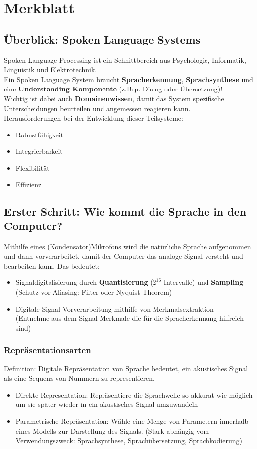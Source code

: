 \newpage
\section{Merkblatt}
\subsection{Überblick: Spoken Language Systems}
Spoken Language Processing ist ein Schnittbereich aus Psychologie, Informatik, Linguistik und Elektrotechnik. \\
Ein Spoken Language System braucht \textbf{Spracherkennung}, \textbf{Sprachsynthese} und eine \textbf{Understanding-Komponente} (z.Bsp. Dialog oder Übersetzung)! \\
Wichtig ist dabei auch \textbf{Domainenwissen}, damit das System spezifische Unterscheidungen beurteilen und angemessen reagieren kann. \\
Herausforderungen bei der Entwicklung dieser Teilsysteme:
\begin{itemize}
\item Robustfähigkeit
\item Integrierbarkeit
\item Flexibilität
\item Effizienz
\end{itemize}

\subsection{Erster Schritt: Wie kommt die Sprache in den Computer?}
Mithilfe eines (Kondensator)Mikrofons wird die natürliche Sprache aufgenommen und dann vorverarbeitet, damit der Computer das analoge Signal versteht und bearbeiten kann. Das bedeutet:
\begin{itemize}
\item Signaldigitalisierung durch \textbf{Quantisierung} ($2^{16}$ Intervalle) und \textbf{Sampling} \\ (Schutz vor Aliasing: Filter oder Nyquist Theorem)
\item Digitale Signal Vorverarbeitung mithilfe von Merkmalsextraktion \\(Entnehme aus dem Signal Merkmale die für die Spracherkennung hilfreich sind)
\end{itemize}
\subsubsection{Repräsentationsarten}
Definition: Digitale Repräsentation von Sprache bedeutet, ein akustisches Signal als eine Sequenz von Nummern zu representieren.
\begin{itemize}
\item Direkte Representation: Repräsentiere die Sprachwelle so akkurat wie möglich um sie später wieder in ein akustisches Signal umzuwandeln
\item Parametrische Repräsentation: Wähle eine Menge von Parametern innerhalb eines Modells zur Darstellung des Signals. (Stark abhängig vom Verwendungszweck: Sprachsynthese, Sprachübersetzung, Sprachkodierung)
\end{itemize}

